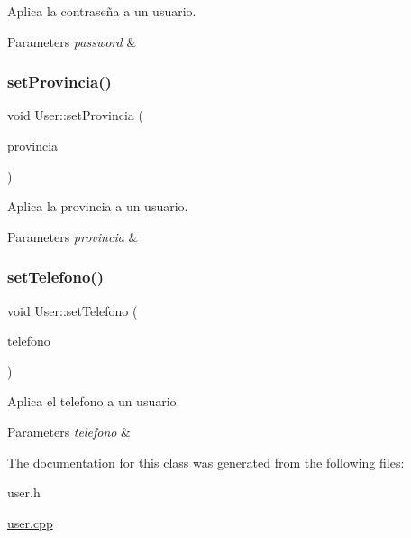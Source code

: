 Aplica la contraseña a un usuario. 


\begin{DoxyParams}{Parameters}
{\em password} & \\
\hline
\end{DoxyParams}
\mbox{\label{classUser_ad5fa7528ea5397868f5cf2ca99fef6cb}} 
\subsubsection{\texorpdfstring{set\+Provincia()}{setProvincia()}}
{\footnotesize\ttfamily void User\+::set\+Provincia (\begin{DoxyParamCaption}\item[{Q\+String}]{provincia }\end{DoxyParamCaption})}



Aplica la provincia a un usuario. 


\begin{DoxyParams}{Parameters}
{\em provincia} & \\
\hline
\end{DoxyParams}
\mbox{\label{classUser_a9fbcdc88fdffe99a216fc35baa7825ae}} 
\subsubsection{\texorpdfstring{set\+Telefono()}{setTelefono()}}
{\footnotesize\ttfamily void User\+::set\+Telefono (\begin{DoxyParamCaption}\item[{Q\+String}]{telefono }\end{DoxyParamCaption})}



Aplica el telefono a un usuario. 


\begin{DoxyParams}{Parameters}
{\em telefono} & \\
\hline
\end{DoxyParams}


The documentation for this class was generated from the following files\+:\begin{DoxyCompactItemize}
\item 
user.\+h\item 
\mbox{\hyperlink{user_8cpp}{user.\+cpp}}\end{DoxyCompactItemize}
